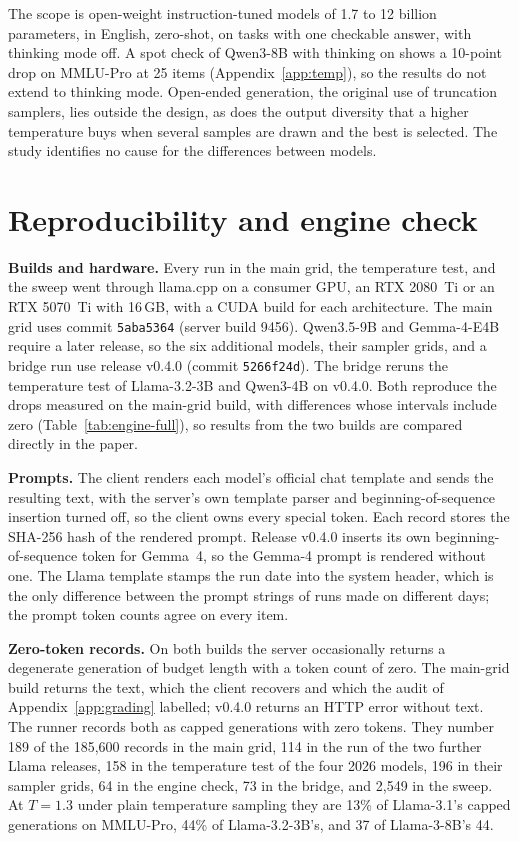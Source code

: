 \documentclass[11pt]{article}
\begin{document}
The scope is open-weight instruction-tuned models of 1.7 to 12 billion parameters, in English,
zero-shot, on tasks with one checkable answer, with thinking mode off. A spot check of Qwen3-8B
with thinking on shows a 10-point drop on MMLU-Pro at 25 items (Appendix~\ref{app:temp}), so
the results do not extend to thinking mode. Open-ended generation, the original use of
truncation samplers, lies outside the design, as does the output diversity that a higher
temperature buys when several samples are drawn and the best is selected. The study identifies
no cause for the differences between models.



\appendix

\section{Reproducibility and engine check}
\label{app:repro}

\textbf{Builds and hardware.} Every run in the main grid, the temperature test, and the sweep
went through llama.cpp \citep{gerganov2023llamacpp} on a consumer GPU, an RTX 2080~Ti or an
RTX 5070~Ti with 16\,GB, with a CUDA build for each architecture. The main grid uses commit
\texttt{5aba5364} (server build 9456). Qwen3.5-9B and Gemma-4-E4B require a later release, so
the six additional models, their sampler grids, and a bridge run use release v0.4.0 (commit
\texttt{5266f24d}). The bridge reruns the temperature test of Llama-3.2-3B and Qwen3-4B on
v0.4.0. Both reproduce the drops measured on the main-grid build, with differences whose
intervals include zero (Table~\ref{tab:engine-full}), so results from the two builds are
compared directly in the paper.

\textbf{Prompts.} The client renders each model's official chat template and sends the
resulting text, with the server's own template parser and beginning-of-sequence insertion
turned off, so the client owns every special token. Each record stores the SHA-256 hash of the
rendered prompt. Release v0.4.0 inserts its own beginning-of-sequence token for Gemma~4, so the
Gemma-4 prompt is rendered without one. The Llama template stamps the run date into the system
header, which is the only difference between the prompt strings of runs made on different
days; the prompt token counts agree on every item.

\textbf{Zero-token records.} On both builds the server occasionally returns a degenerate
generation of budget length with a token count of zero. The main-grid build returns the text,
which the client recovers and which the audit of Appendix~\ref{app:grading} labelled;
v0.4.0 returns an HTTP error without text. The runner records both as capped generations with
zero tokens. They number 189 of the 185,600 records in the main grid, 114 in the run of the two
further Llama releases, 158 in the temperature test of the four 2026 models, 196 in their
sampler grids, 64 in the engine check, 73 in the bridge, and 2,549 in the sweep. At $T{=}1.3$
under plain temperature sampling they are 13\% of Llama-3.1's capped generations on MMLU-Pro, 44\%
of Llama-3.2-3B's, and 37 of Llama-3-8B's 44.
\end{document}
